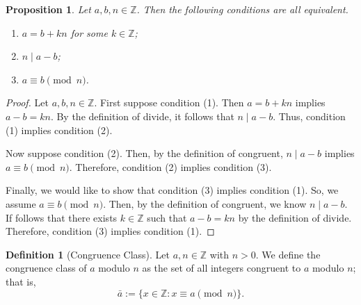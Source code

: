 \documentclass[12pt, titlepage]{amsart}
\newcommand\Z{{\mathbb Z}}
\newcommand\N{{\mathbb N}}
\newtheorem{theorem}{Theorem}[subsection]
\newtheorem{prop}{Proposition}[subsection]
\theoremstyle{definition}
\newtheorem{definition}{Definition}[subsection]
\begin{document}
	\begin{prop}\label{proposition:equivalent_conditions_for_congruent}
		Let $a, b, n \in \Z$. Then the following conditions are all equivalent.
		\begin{enumerate}
			\item $a = b + kn$ for some $k \in \Z$;
			\item $n \mid a - b$;
			\item $a \equiv b \pmod n$.
		\end{enumerate}		
	\end{prop}
	
	\begin{proof}
		Let $a, b, n \in \Z$.
		First suppose condition (1).
		Then $a = b + kn$ implies $a-b = kn$.
		By the definition of divide, it follows that $n \mid a - b$.
		Thus, condition (1) implies condition (2).
		
		Now suppose condition (2).
		Then, by the definition of congruent, $n \mid a - b$ implies $a \equiv b \pmod n$.
		Therefore, condition (2) implies condition (3).
		
		Finally, we would like to show that condition (3) implies condition (1).
		So, we assume $a \equiv b \pmod n$.
		Then, by the definition of congruent, we know $n \mid a - b$.
		If follows that there exists $k \in \Z$ such that $a-b = kn$ by the definition of divide.
		Therefore, condition (3) implies condition (1).

	\end{proof}
	
	
%	
	\begin{definition}[Congruence Class]\label{definition:congruence_class}
		Let $a,n \in \Z$ with $n > 0$. We define the congruence class of $a$ modulo $n$ as the set of all integers congruent to $a$ modulo $n$; that is, $$\bar{a} := \{ x \in \Z : x \equiv a \pmod n \}.$$%
	\end{definition}
	
\end{document}
